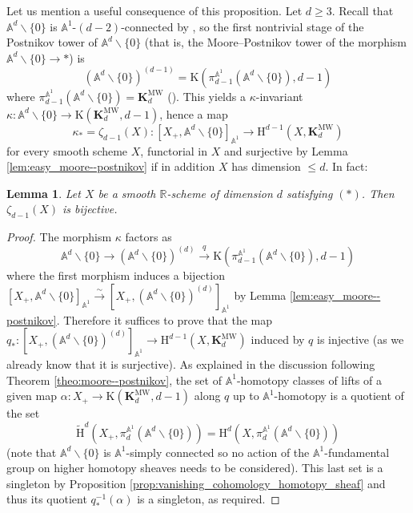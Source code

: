 \documentclass[11pt,leqno]{amsart}
\renewcommand{\1}{{\rm 1\hspace*{-0.4ex}%
\rule{0.1ex}{1.52ex}\hspace*{0.2ex}}}
\newcommand{\Hr}{{\mathrm {H}}}
\newcommand{\<}[1]{{\langle}#1 {\rangle}}
\newcommand{\Rb}{\mathbb{R}}
\newcommand{\Kr}{\mathrm{K}}
\newcommand{\Kbf}{\mathbf{K}}
\newcommand{\Abb}{\mathbb{A}}
\newcommand{\MW}{\mathrm{MW}}
\theoremstyle{plain}
\newtheorem{lem}[thm]{Lemma}
\theoremstyle{definition}
\theoremstyle{remark}
\numberwithin{equation}{section}
\begin{document}
Let us mention a useful consequence of this proposition. Let $d\geq 3$. Recall that $\Abb^d\smallsetminus\{0\}$ is $\Abb^1$-$(d-2)$-connected by \cite[Theorem 6.38]{morelA1AlgebraicTopologyField2012}, so the first nontrivial stage of the Postnikov tower of $\Abb^d\smallsetminus\{0\}$ (that is, the Moore--Postnikov tower of the morphism $\Abb^d\smallsetminus\{0\}\to *$) is 
\[
(\Abb^d\smallsetminus\{0\})^{(d-1)}=\Kr(\pi_{d-1}^{\Abb^1}(\Abb^d\smallsetminus\{0\}),d-1)
\] 
where $\pi_{d-1}^{\Abb^1}(\Abb^d\smallsetminus\{0\})=\Kbf_d^\MW$ (\cite[Theorem 6.40]{morelA1AlgebraicTopologyField2012}). This yields a $\kappa$-invariant $\kappa:\Abb^d\smallsetminus\{0\}\to\Kr(\Kbf_d^\MW,d-1)$, hence a map \[\kappa_*=\zeta_{d-1}(X):[X_+,\Abb^d\smallsetminus\{0\}]_{\Abb^1}\to\Hr^{d-1}(X,\Kbf_d^\MW)\] for every smooth scheme $X$, functorial in $X$ and surjective by Lemma \ref{lem:easy_moore--postnikov} if in addition $X$ has dimension $\leq d$. In fact:

\begin{lem}\label{lem:wms_bijective}
Let $X$ be a smooth $\Rb$-scheme of dimension $d$ satisfying $(*)$. Then $\zeta_{d-1}(X)$ is bijective.
\end{lem}

\begin{proof}
The morphism $\kappa$ factors as \[\Abb^d\smallsetminus\{0\}\to(\Abb^d\smallsetminus\{0\})^{(d)}\xrightarrow{q}\Kr(\pi_{d-1}^{\Abb^1}(\Abb^d\smallsetminus\{0\}),d-1)\] where the first morphism induces a bijection $[X_+,\Abb^d\smallsetminus\{0\}]_{\Abb^1}\xrightarrow{\sim}[X_+,(\Abb^d\smallsetminus\{0\})^{(d)}]_{\Abb^1}$ by Lemma \ref{lem:easy_moore--postnikov}. Therefore it suffices to prove that the map $q_*:[X_+,(\Abb^d\smallsetminus\{0\})^{(d)}]_{\Abb^1}\to\Hr^{d-1}(X,\Kbf_d^\MW)$ induced by $q$ is injective (as we already know that it is surjective). As explained in the discussion following Theorem \ref{theo:moore--postnikov}, the set of $\Abb^1$-homotopy classes of lifts of a given map $\alpha:X_+\to\Kr(\Kbf_d^\MW,d-1)$ along $q$ up to $\Abb^1$-homotopy is a quotient of the set \[\widetilde{\Hr}^d(X_+,\pi_d^{\Abb^1}(\Abb^d\smallsetminus\{0\}))=\Hr^d(X,\pi_d^{\Abb^1}(\Abb^d\smallsetminus\{0\}))\] (note that $\Abb^d\smallsetminus\{0\}$ is $\Abb^1$-simply connected so no action of the $\Abb^1$-fundamental group on higher homotopy sheaves needs to be considered). This last set is a singleton by Proposition \ref{prop:vanishing_cohomology_homotopy_sheaf} and thus its quotient $q_*^{-1}(\alpha)$ is a singleton, as required.
\end{proof}
\end{document}
